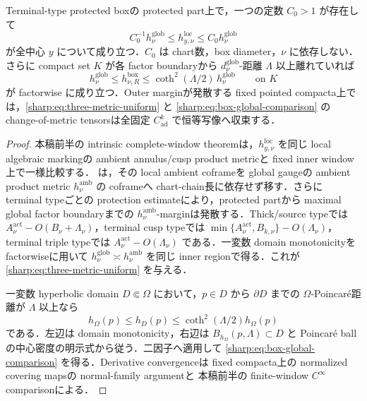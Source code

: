 \documentclass[a4paper,11pt]{ltjsarticle}
\numberwithin{equation}{section}
\theoremstyle{plain}
\theoremstyle{definition}
\theoremstyle{remark}
\begin{document}
\begin{corollary}\label{sharp:cor:three-metric-comparison}
Terminal-type protected boxの protected part上で，一つの定数 $C_0>1$ が存在して
\begin{equation}\label{sharp:eq:three-metric-uniform}
 C_0^{-1}h^{\mathrm{glob}}_\nu
 \le h^{\mathrm{loc}}_{y,\nu}
 \le C_0h^{\mathrm{glob}}_\nu
\end{equation}
が全中心 $y$ について成り立つ．$C_0$ は chart数，box diameter，$\nu$ に依存しない．
さらに compact set $K$ が各 factor boundaryから $d^{\mathrm{glob}}_\nu$-距離 $\Lambda$ 以上離れていれば
\begin{equation}\label{sharp:eq:box-global-comparison}
 h^{\mathrm{glob}}_\nu
 \le h^{\mathrm{box}}_{\nu,R}
 \le \coth^2(\Lambda/2)\,h^{\mathrm{glob}}_\nu
 \qquad\text{on }K
\end{equation}
が factorwise に成り立つ．Outer marginが発散する fixed pointed compacta上では，\eqref{sharp:eq:three-metric-uniform} と \eqref{sharp:eq:box-global-comparison} の change-of-metric tensorsは全固定 $C^k_{\mathrm{ad}}$ で恒等写像へ収束する．
\end{corollary}

\begin{proof}
本稿前半の intrinsic complete-window theoremは，$h^{\mathrm{loc}}_{y,\nu}$ を同じ local algebraic markingの ambient annulus/cusp product metricと fixed inner window上で一様比較する． は，その local ambient coframeを global gaugeの ambient product metric $h^{\mathrm{amb}}_\nu$ の coframeへ chart-chain長に依存せず移す．さらに terminal typeごとの protection estimateにより，protected partから maximal global factor boundaryまでの $h^{\mathrm{amb}}_\nu$-marginは発散する．Thick/source typeでは $A_\nu^{\mathrm{act}}-O(B_\nu+\Lambda_\nu)$，terminal cusp typeでは $\min\{A_\nu^{\mathrm{act}},B_{k,\nu}\}-O(\Lambda_\nu)$，terminal triple typeでは $A_\nu^{\mathrm{act}}-O(\Lambda_\nu)$ である．一変数 domain monotonicityを factorwiseに用いて $h^{\mathrm{glob}}_\nu\asymp h^{\mathrm{amb}}_\nu$ を同じ inner regionで得る．これが \eqref{sharp:eq:three-metric-uniform} を与える．

一変数 hyperbolic domain $D\Subset\Omega$ において，$p\in D$ から $\partial D$ までの $\Omega$-Poincar\'e距離が $\Lambda$ 以上なら
\[
 h_\Omega(p)\le h_D(p)\le \coth^2(\Lambda/2)h_\Omega(p)
\]
である．左辺は domain monotonicity，右辺は $B_{h_\Omega}(p,\Lambda)\subset D$ と Poincar\'e ballの中心密度の明示式から従う．二因子へ適用して \eqref{sharp:eq:box-global-comparison} を得る．Derivative convergenceは fixed compacta上の normalized covering mapsの normal-family argumentと 本稿前半の finite-window $C^\infty$ comparisonによる．
\end{proof}
\end{document}

